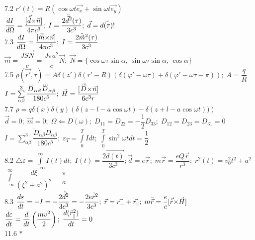 \num{7.2}
$r'(t) = R(\cos \omega t \vec{e_x} + \sin \omega t \vec{e_y})$\\
$\dfrac{d I}{d \Omega}=\dfrac{[\vec{\ddot{d}}{\times}\vec{n}]}{4\pi c^3};\; I = \dfrac{2\ddot{\vec{d}}^2(\tau)}{3c^3};\; \vec{d} = \vec{d(\tau)}! $\\

\num{7.3}
$\dfrac{d I}{d \Omega}=\dfrac{[\vec{\ddot{m}}{\times}\vec{n}]}{4\pi c^3};\; I = \dfrac{2\ddot{\vec{m}}^2(\tau)}{3c^3}$\\
$\vec{m} = \dfrac{JS\vec{N}}{c} = \dfrac{J\pi a^2}{c}\vec{N};\; \vec{N} = \{\cos\omega\tau \sin\alpha,\,\sin\omega\tau\sin\alpha,\,\cos\alpha \}$\\

\num{7.5}
$\rho(\vec{r'},\tau) = A \delta(z')\delta(r'-R)\left(\delta(\varphi'-\omega\tau)+\delta(\varphi'-\omega\tau-\pi) \right);\; A = \dfrac{q}{R}$\\
$I = \sum\limits_{\alpha\beta}^3 \dfrac{\dddot{D}_{\alpha\beta} \dddot{D}_{\alpha\beta}}{180c^5};\;\vec{H}=\dfrac{[\vec{\dddot{D}}{\times}\vec{n}]}{6c^3 r} $\\

\num{7.7}
$\rho = q \delta(x) \delta(y) \left( \delta(z-l-a\cos{\omega t}) - \delta(z+l-a\cos{\omega t})) \right)$\\
$\vec{d} = 0;\; \vec{m} = 0;\; \Omega \Leftarrow D(\omega);\; D_{11}=D_{22}=-\dfrac1{2}D_{33};\;D_{12}=D_{23}=D_{31}=0$\\
$I = \sum\limits_{\alpha\beta}^3 \dfrac{\dddot{D}_{\alpha\beta} \dddot{D}_{\alpha\beta}}{180c^5};\; \varepsilon_T = \int\limits_0^T I dt;\; \int\limits_0^T \sin^2 \omega t dt = \dfrac{1}{2}$\\

\num{8.2}
$\triangle \varepsilon = \int\limits_{-\infty}^\infty I(t)dt;\; I(t) = \dfrac{2\ddot{\vec{d(t)}}}{3c^3}; \vec{d}=e\vec{r};\;m\ddot{\vec{r}}=\dfrac{eQ\vec{r}}{r^3};\;r^2(t)=v_0^2 t^2 + a^2$\\
$\int\limits_{-\infty}^\infty \dfrac{d\xi}{(\xi^2+a^2)^2} = \dfrac{\pi}{a}$\\

\num{8.3}
$\dfrac{d \varepsilon}{d t} = -I = -\dfrac{2\ddot{\vec{d}}^2}{3c^3} = -\dfrac{2e\ddot{\vec{r}}^2}{3c^3};\;\vec{r}=\vec{r_\perp}+\vec{r_\|};\;m\ddot{\vec{r}}=\dfrac{e}{c}[\vec{\dot{r}}{\times}\vec{H}]$\\
$\dfrac{d \varepsilon}{d t} = \dfrac{d }{d t}\left(\dfrac{mv^2}{2} \right);\; \dfrac{d (\ddot{r}_\|^2)}{d t} = 0$\\

\num{11.6}
$* $\\

